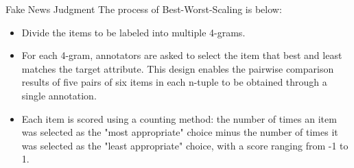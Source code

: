 \documentclass[10pt]{beamer}
\begin{document}
\begin{frame}{Fake News Judgment}
The process of Best-Worst-Scaling is below:
\begin{itemize}
    \item Divide the items to be labeled into multiple 4-grams.
    \item For each 4-gram, annotators are asked to select the item that best and least matches the target attribute. This design enables the pairwise comparison results of five pairs of six items in each n-tuple to be obtained through a single annotation.
    \item Each item is scored using a counting method: the number of times an item was selected as the "most appropriate" choice minus the number of times it was selected as the "least appropriate" choice, with a score ranging from -1 to 1.
\end{itemize}
\end{frame}
\end{document}

